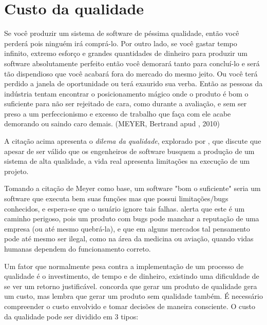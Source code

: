 \documentclass[
	12pt,				%
	openright,			%
	oneside,			%
	a4paper,			%
	english,			%
	brazil,				%
	]{abntex2}
\begin{document}
\section{Custo da qualidade}
\begin{citacao} %
Se você produzir um sistema de software de péssima qualidade, então você perderá pois ninguém irá comprá-lo. Por outro lado, se você gastar tempo infinito, extremo esforço e grandes quantidades de dinheiro para produzir um software absolutamente perfeito então você demorará tanto para concluí-lo e será tão dispendioso que você acabará fora do mercado do mesmo jeito. Ou você terá perdido a janela de oportunidade ou terá exaurido sua verba. Então as pessoas da indústria tentam encontrar o posicionamento mágico onde o produto é bom o suficiente para não ser rejeitado de cara, como durante a avaliação, e sem ser preso a um perfeccionismo e excesso de trabalho que faça com ele acabe demorando ou saindo caro demais. (MEYER, Bertrand apud , 2010)
\end{citacao}


A citação acima apresenta o \emph{dilema da qualidade}, explorado por , que discute que apesar de ser válido que os engenheiros de software busquem a produção de um sistema de alta qualidade, a vida real apresenta limitações na execução de um projeto.

Tomando a citação de Meyer como base, um software "bom o suficiente" seria um software que executa bem suas funções mas que possui limitações/bugs conhecidos, e espera-se que o usuário ignore tais falhas.  alerta que este é um caminho perigoso, pois um produto com bugs pode manchar a reputação de uma empresa (ou até mesmo quebrá-la), e que em alguns mercados tal pensamento pode até mesmo ser ilegal, como na área da medicina ou aviação, quando vidas humanas dependem do funcionamento correto.

Um fator que normalmente pesa contra a implementação de um processo de qualidade é o investimento, de tempo e de dinheiro, existindo uma dificuldade de se ver um retorno justificável.  concorda que gerar um produto de qualidade gera um custo, mas lembra que gerar um produto sem qualidade também. É necessário compreender o custo envolvido e tomar decisões de maneira consciente. O custo da qualidade pode ser dividido em 3 tipos:
\end{document}
